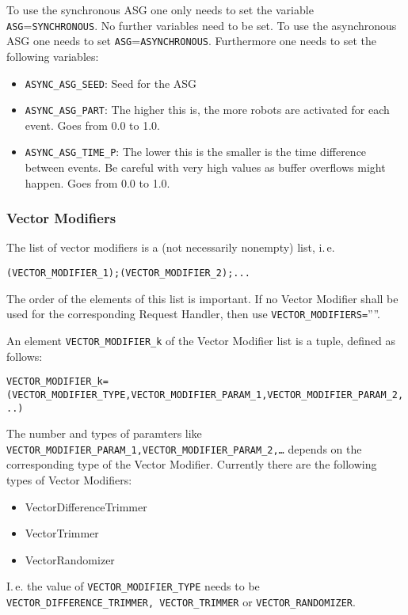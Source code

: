 To use the synchronous ASG one only needs to set the variable \texttt{ASG}=\texttt{SYNCHRONOUS}. No further variables need to be set.
To use the asynchronous ASG one needs to set \texttt{ASG}=\texttt{ASYNCHRONOUS}. Furthermore one needs to set the following variables:
\begin{itemize}
\item \texttt{ASYNC\_ASG\_SEED}: Seed for the ASG
\item \texttt{ASYNC\_ASG\_PART}: The higher this is, the more robots are activated for each event. Goes from 0.0 to 1.0.
\item \texttt{ASYNC\_ASG\_TIME\_P}: The lower this is the smaller is the time difference between events. Be careful with very high values as buffer overflows might happen. Goes from 0.0 to 1.0.
\end{itemize}

\subsubsection{Vector Modifiers}\label{sec:vectorModifiers}

The list of vector modifiers is a (not necessarily nonempty) list, i.\,e. 
\begin{center}\scriptsize
	\texttt{(VECTOR\_MODIFIER\_1);(VECTOR\_MODIFIER\_2);...}
\end{center}
The order of the elements of this list is important. If no Vector Modifier shall be used for the corresponding Request Handler, then use \texttt{VECTOR\_MODIFIERS=}''''.

An element \texttt{VECTOR\_MODIFIER\_k} of the Vector Modifier list is a tuple, defined as follows:
\begin{center}\scriptsize
	\texttt{VECTOR\_MODIFIER\_k=(VECTOR\_MODIFIER\_TYPE,VECTOR\_MODIFIER\_PARAM\_1,VECTOR\_MODIFIER\_PARAM\_2,..)}
\end{center}
The number and types of paramters like \texttt{VECTOR\_MODIFIER\_PARAM\_1,\newline VECTOR\_MODIFIER\_PARAM\_2,\dots} depends on the corresponding type of the Vector Modifier. Currently there are the following types of Vector Modifiers:
\begin{itemize}
	\item VectorDifferenceTrimmer
	\item VectorTrimmer
	\item VectorRandomizer
\end{itemize}
I.\,e. the value of \texttt{VECTOR\_MODIFIER\_TYPE} needs to be \texttt{VECTOR\_DIFFERENCE\_TRIMMER, VECTOR\_TRIMMER} or \texttt{VECTOR\_RANDOMIZER}.


